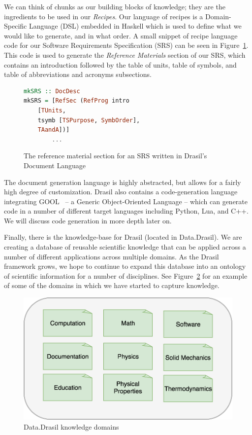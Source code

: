 \documentclass[sigconf]{acmart}
\begin{document}
We can think of chunks as our building blocks of knowledge; they are the 
ingredients to be used in our \textit{Recipes}. Our language of recipes is a 
Domain-Specific Language (DSL) embedded in Haskell which is used to define what 
we would like to generate, and in what order. A small snippet of recipe 
language code for our Software Requirements Specification (SRS) can be seen in 
Figure~\ref{recipeLang}. This code is used to generate the \textit{Reference 
Materials} section of our SRS, which contains an introduction followed by the 
table of units, table of symbols, and table of abbreviations and acronyms 
subsections.

\begin{figure}
\begin{lstlisting}[language=Haskell, frame=single, showstringspaces=false, 
basicstyle=\small]
mkSRS :: DocDesc 
mkSRS = [RefSec (RefProg intro 
	[TUnits, 
	tsymb [TSPurpose, SymbOrder], 
	TAandA])]
        ...
\end{lstlisting}
\caption{The reference material section for an SRS written in Drasil's Document 
Language}
\label{recipeLang}
\end{figure}

The document generation language is highly abstracted, but allows for a fairly 
high degree of customization. Drasil also contains a code-generation language 
integrating GOOL~\cite{GOOL} -- a Generic Object-Oriented Language -- which can 
generate code in a number of different target languages including Python, Lua, 
and C++. We will discuss code generation in more depth later on.

Finally, there is the knowledge-base for Drasil (located in Data.Drasil). We 
are creating a database of reusable scientific knowledge that can be applied 
across a number of different applications across multiple domains. As the 
Drasil framework grows, we hope to continue to expand this database into an 
ontology of scientific information for a number of disciplines. See 
Figure~\ref{ontology} for an example of some of the domains in which we have 
started to capture knowledge.

\begin{figure}
	\includegraphics[width=.5\textwidth]{figures/ontology.png}
	\caption{Data.Drasil knowledge domains}
	\label{ontology}
\end{figure}
\end{document}
